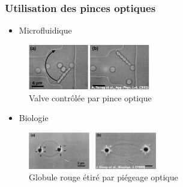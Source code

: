 \documentclass[9pt,a9paper,handout]{beamer}
\begin{document}
    \begin{frame}
        \frametitle{Utilisation des pinces optiques}
        \begin{itemize} \item Microfluidique
        \end{itemize}
        \begin{figure}[h] \includegraphics[width=0.5\textwidth]{Images/Intro/microfluidique}
            \caption{Valve contrôlée par pince optique}
        \end{figure}
        
        \begin{itemize} \item Biologie
        \end{itemize}
        \begin{figure}[h] \includegraphics[width=0.5\textwidth]{Images/Intro/biologie}
            \caption{Globule rouge étiré par piégeage optique}
        \end{figure}
    \end{frame}
\end{document}
